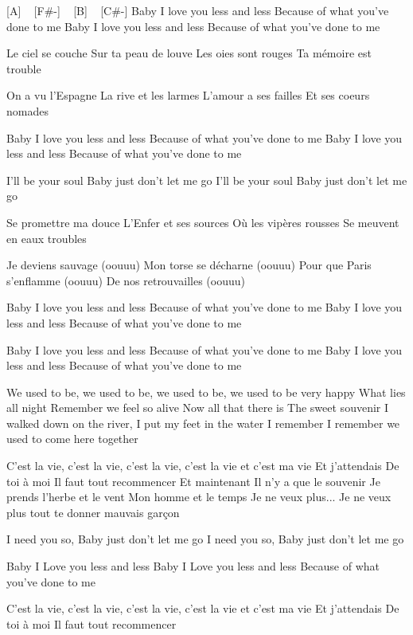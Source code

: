 [A] ~ [F#-] ~ [B] ~ [C#-]
Baby I love you less and less
Because of what you've done to me
Baby I love you less and less
Because of what you've done to me

Le ciel se couche
Sur ta peau de louve
Les oies sont rouges
Ta mémoire est trouble

On a vu l'Espagne
La rive et les larmes
L'amour a ses failles
Et ses coeurs nomades

Baby I love you less and less
Because of what you've done to me
Baby I love you less and less
Because of what you've done to me

I'll be your soul
Baby just don't let me go
I'll be your soul
Baby just don't let me go

Se promettre ma douce
L'Enfer et ses sources
Où les vipères rousses
Se meuvent en eaux troubles

Je deviens sauvage (oouuu)
Mon torse se décharne (oouuu)
Pour que Paris s'enflamme (oouuu)
De nos retrouvailles (oouuu)


Baby I love you less and less
Because of what you've done to me
Baby I love you less and less
Because of what you've done to me

Baby I love you less and less
Because of what you've done to me
Baby I love you less and less
Because of what you've done to me

We used to be, we used to be, we used to be,
we used to be very happy
What lies all night
Remember we feel so alive
Now all that there is
The sweet souvenir
I walked down on the river, I put my feet in the water
I remember I remember we used to come here together

C'est la vie, c'est la vie, c'est la vie, c'est la vie et c'est ma vie
Et j'attendais
De toi à moi
Il faut tout recommencer
Et maintenant
Il n'y a que le souvenir
Je prends l'herbe et le vent
Mon homme et le temps
Je ne veux plus...
Je ne veux plus tout te donner mauvais garçon

 

I need you so,
Baby just don't let me go
I need you so,
Baby just don't let me go

Baby I Love you less and less
Baby I Love you less and less
Because of what you've done to me 

C'est la vie, c'est la vie, c'est la vie, c'est la vie et c'est ma vie
Et j'attendais
De toi à moi
Il faut tout recommencer